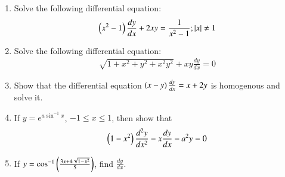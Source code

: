 \begin{enumerate}

\item Solve the following differential equation:
    \begin{align*}
    \left(x^2 - 1\right)\frac{dy}{dx} + 2xy = \frac{1}{x^2 - 1}; \lvert x \rvert \neq 1
    \end{align*}

\item Solve the following differential equation:
    \begin{align*}
    \sqrt{1 + x^2 + y^2 + x^2 y^2} + xy\frac{dy}{dx}= 0
    \end{align*}

\item Show that the differential equation
    $
    \left(x-y\right)\frac{dy}{dx} = x + 2y
    $
    is homogenous and solve it.

    \item If $y = e^{a\sin^{-1} x}$, $-1 \le x \le 1$, then show that
    \begin{align*}
    \left(1 - x^2\right)\frac{d^2y}{dx^2} - x\frac{dy}{dx} - a^2y = 0
    \end{align*}

\item If $y = \cos^{-1} \left(\frac{3x + 4 \sqrt{1 - x^2}}{5}\right)$, find $\frac{dy}{dx}$.

\end{enumerate}